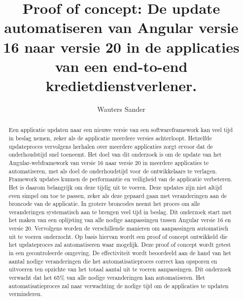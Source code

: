 \documentclass{hogent-article}
\title{Proof of concept: De update automatiseren van Angular versie 16 naar versie 20 in de applicaties van een end-to-end kredietdienstverlener.}
\author{Wauters Sander}
\begin{document}
\begin{abstract}

Een applicatie updaten naar een nieuwe versie van een softwareframework kan veel tijd in beslag nemen, zeker als de applicatie meerdere versies achterloopt.
Hetzelfde updateproces vervolgens herhalen over meerdere applicaties zorgt ervoor dat de onderhoudstijd snel toeneemt.
Het doel van dit onderzoek is om de update van het Angular-webframework van versie 16 naar versie 20 in meerdere applicaties te automatiseren, met als doel de onderhoudstijd voor de ontwikkelaars te verlagen.
Framework updates kunnen de performantie en veiligheid van de applicatie verbeteren.
Het is daarom belangrijk om deze tijdig uit te voeren.
Deze updates zijn niet altijd even simpel om toe te passen, zeker als deze gepaard gaan met veranderingen aan de broncode van de applicatie.
In grotere broncodes neemt het proces om alle veranderingen systematisch aan te brengen veel tijd in beslag.
Dit onderzoek start met het maken van een oplijsting van alle nodige aanpassingen tussen Angular versie 16 en versie 20.
Vervolgens worden de verschillende manieren om aanpassingen automatisch uit te voeren onderzocht.
Op basis hiervan wordt een proof of concept ontwikkeld die het updateproces zal automatiseren waar mogelijk.
Deze proof of concept wordt getest in een gecontroleerde omgeving.
De effectiviteit wordt beoordeeld aan de hand van het aantal nodige veranderingen die het automatisatieproces correct kan opsporen en uitvoeren ten opzichte van het totaal aantal uit te voeren aanpassingen.
Dit onderzoek verwacht dat het 65\% van alle nodige veranderingen kan automatiseren.
Het automatisatieproces zal naar verwachting de nodige tijd om de applicaties te updaten verminderen.

\end{abstract}

\tableofcontents



\printbibliography[heading=bibintoc]
\end{document}
